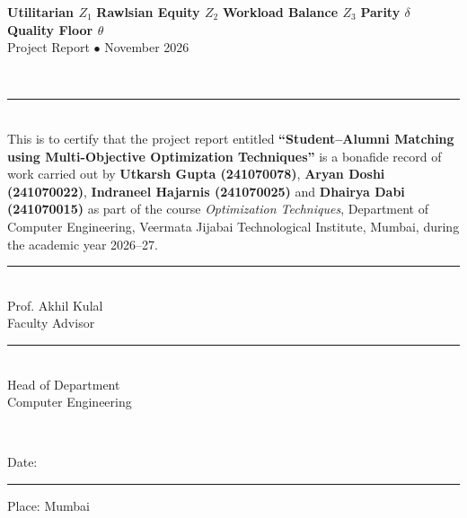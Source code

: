 \documentclass[11pt,a4paper,oneside]{report}
\begin{document}
\begin{titlepage}
    \vfill
    \centering
    \colorbox{navyBlue}{\color{white}\textbf{\; Utilitarian $Z_1$ \;}}\quad
    \colorbox{headerNavy}{\color{white}\textbf{\; Rawlsian Equity $Z_2$ \;}}\quad
    \colorbox{ruleGold}{\color{white}\textbf{\; Workload Balance $Z_3$ \;}}\quad
    \colorbox{darkSlate}{\color{white}\textbf{\; Parity $\delta$ \;}}\quad
    \colorbox{vjtiMaroon}{\color{white}\textbf{\; Quality Floor $\theta$ \;}}\\[1.2cm]

    {\small\color{gray} Project Report $\bullet$ November 2026}
\end{titlepage}

\\[0.2cm]
\noindent\textcolor{ruleGold}{\rule{\textwidth}{1.5pt}}\\[0.6cm]

This is to certify that the project report entitled \textbf{``Student--Alumni Matching using Multi-Objective Optimization Techniques''} is a bonafide record of work carried out by \textbf{Utkarsh Gupta (241070078)}, \textbf{Aryan Doshi (241070022)}, \textbf{Indraneel Hajarnis (241070025)} and \textbf{Dhairya Dabi (241070015)} as part of the course \textit{Optimization Techniques}, Department of Computer Engineering, Veermata Jijabai Technological Institute, Mumbai, during the academic year 2026--27.\\[3.5cm]

\noindent
\begin{minipage}{0.45\textwidth}
    \rule{6cm}{0.5pt}\\[0.15cm]
    Prof. Akhil Kulal\\
    Faculty Advisor
\end{minipage}
\hfill
\begin{minipage}{0.45\textwidth}
    \flushright
    \rule{6cm}{0.5pt}\\[0.15cm]
    Head of Department\\
    Computer Engineering
\end{minipage}\\[3.0cm]

\noindent
\begin{minipage}{0.45\textwidth}
    Date: \rule{4cm}{0.5pt}
\end{minipage}
\hfill
\begin{minipage}{0.45\textwidth}
    \flushright
    Place: Mumbai
\end{minipage}
\end{document}
